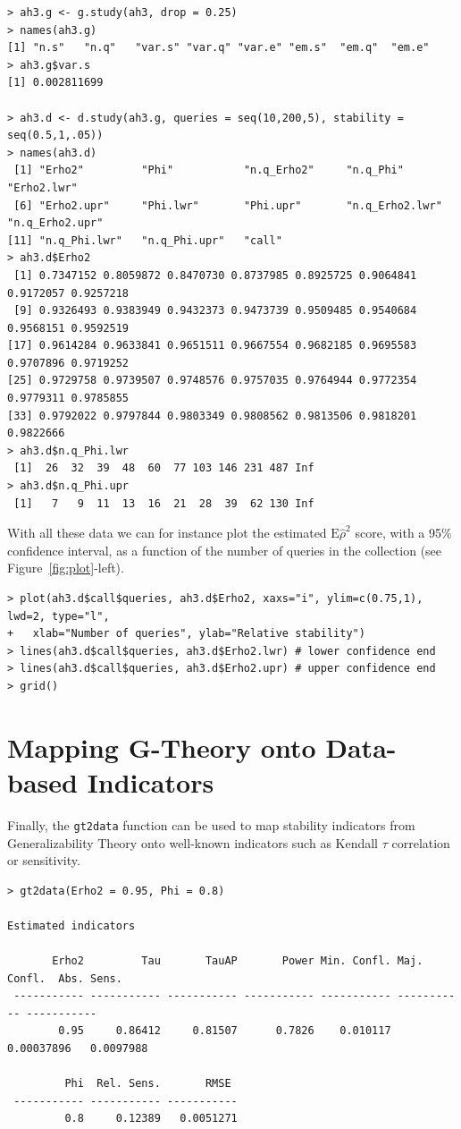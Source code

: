 \documentclass[twoside]{article}
\begin{document}
{\small\begin{verbatim}
> ah3.g <- g.study(ah3, drop = 0.25)
> names(ah3.g)
[1] "n.s"   "n.q"   "var.s" "var.q" "var.e" "em.s"  "em.q"  "em.e" 
> ah3.g$var.s
[1] 0.002811699

> ah3.d <- d.study(ah3.g, queries = seq(10,200,5), stability = seq(0.5,1,.05))
> names(ah3.d)
 [1] "Erho2"         "Phi"           "n.q_Erho2"     "n.q_Phi"       "Erho2.lwr"    
 [6] "Erho2.upr"     "Phi.lwr"       "Phi.upr"       "n.q_Erho2.lwr" "n.q_Erho2.upr"
[11] "n.q_Phi.lwr"   "n.q_Phi.upr"   "call"
> ah3.d$Erho2
 [1] 0.7347152 0.8059872 0.8470730 0.8737985 0.8925725 0.9064841 0.9172057 0.9257218
 [9] 0.9326493 0.9383949 0.9432373 0.9473739 0.9509485 0.9540684 0.9568151 0.9592519
[17] 0.9614284 0.9633841 0.9651511 0.9667554 0.9682185 0.9695583 0.9707896 0.9719252
[25] 0.9729758 0.9739507 0.9748576 0.9757035 0.9764944 0.9772354 0.9779311 0.9785855
[33] 0.9792022 0.9797844 0.9803349 0.9808562 0.9813506 0.9818201 0.9822666
> ah3.d$n.q_Phi.lwr
 [1]  26  32  39  48  60  77 103 146 231 487 Inf
> ah3.d$n.q_Phi.upr
 [1]   7   9  11  13  16  21  28  39  62 130 Inf
\end{verbatim}}

With all these data we can for instance plot the estimated $\text{E}\hat\rho^2$ score, with a 95\% confidence interval, as a function of the number of queries in the collection (see Figure~\ref{fig:plot}-left).

{\small\begin{verbatim}
> plot(ah3.d$call$queries, ah3.d$Erho2, xaxs="i", ylim=c(0.75,1), lwd=2, type="l",
+   xlab="Number of queries", ylab="Relative stability")
> lines(ah3.d$call$queries, ah3.d$Erho2.lwr) # lower confidence end
> lines(ah3.d$call$queries, ah3.d$Erho2.upr) # upper confidence end
> grid()
\end{verbatim}}


\section{Mapping G-Theory onto Data-based Indicators}

Finally, the \texttt{gt2data} function can be used to map stability indicators from Generalizability Theory onto well-known indicators such as Kendall $\tau$ correlation or sensitivity.

{\small\begin{verbatim}
> gt2data(Erho2 = 0.95, Phi = 0.8)

Estimated indicators

       Erho2         Tau       TauAP       Power Min. Confl. Maj. Confl.  Abs. Sens.
 ----------- ----------- ----------- ----------- ----------- ----------- -----------
        0.95     0.86412     0.81507      0.7826    0.010117  0.00037896   0.0097988 

         Phi  Rel. Sens.       RMSE
 ----------- ----------- -----------
         0.8     0.12389   0.0051271
\end{verbatim}}
\end{document}

